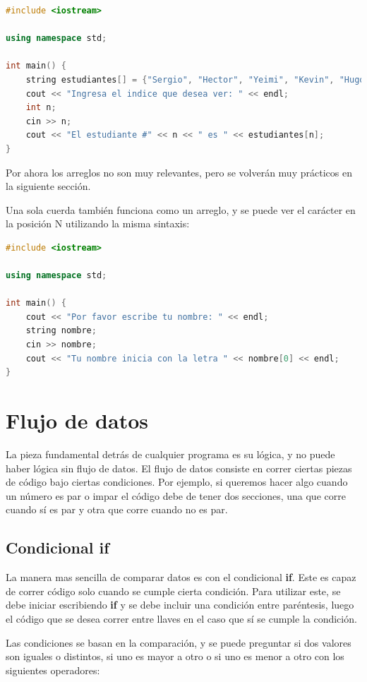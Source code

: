 \documentclass{article}
\begin{document}
\begin{lstlisting}[language=C++, title=Arreglo de cuerdas]
#include <iostream>

using namespace std;

int main() {
	string estudiantes[] = {"Sergio", "Hector", "Yeimi", "Kevin", "Hugo"};
	cout << "Ingresa el indice que desea ver: " << endl;
	int n;
	cin >> n;
	cout << "El estudiante #" << n << " es " << estudiantes[n];
}
\end{lstlisting}

Por ahora los arreglos no son muy relevantes, pero se volverán muy prácticos en la siguiente sección.

Una sola cuerda también funciona como un arreglo, y se puede ver el carácter en la posición N utilizando la misma sintaxis:

\begin{lstlisting}[language=C++, title=Cuerdas como arreglos]
#include <iostream>

using namespace std;

int main() {
	cout << "Por favor escribe tu nombre: " << endl;
	string nombre;
	cin >> nombre;
	cout << "Tu nombre inicia con la letra " << nombre[0] << endl;
}
\end{lstlisting}

\section{Flujo de datos}

La pieza fundamental detrás de cualquier programa es su lógica, y no puede haber lógica sin flujo de datos. El flujo de datos consiste en correr ciertas piezas de código bajo ciertas condiciones. Por ejemplo, si queremos hacer algo cuando un número es par o impar el código debe de tener dos secciones, una que corre cuando sí es par y otra que corre cuando no es par.

\subsection{Condicional if}

La manera mas sencilla de comparar datos es con el condicional \textbf{if}. Este es capaz de correr código solo cuando se cumple cierta condición. Para utilizar este, se debe iniciar escribiendo \textbf{if} y se debe incluir una condición entre paréntesis, luego el código que se desea correr entre llaves en el caso que sí se cumple la condición.

Las condiciones se basan en la comparación, y se puede preguntar si dos valores son iguales o distintos, si uno es mayor a otro o si uno es menor a otro con los siguientes operadores: \\
\end{document}
